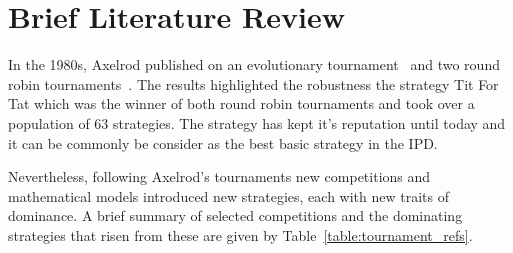 \section{Brief Literature Review}\label{section:introduction_brief_literature}

In the 1980s, Axelrod published on an evolutionary tournament~\cite{Axelrod1981}
and two round robin tournaments~\cite{Axelrod1980a, Axelrod1980b}. The results
highlighted the robustness the strategy Tit For Tat which was the winner
of both round robin tournaments and took over a population of 63 strategies.
The strategy has kept it's reputation until today and it can be commonly be
consider as the best basic strategy in the IPD.

Nevertheless, following Axelrod's tournaments new competitions and mathematical
models introduced new strategies, each with new traits of dominance.
A brief summary of selected competitions and the dominating strategies that risen
from these are given by Table~\ref{table:tournament_refs}.

\begin{table}[htbp]
    \centering
    \caption{An overview of published tournaments}
    \label{table:tournament_refs}
\end{table}


